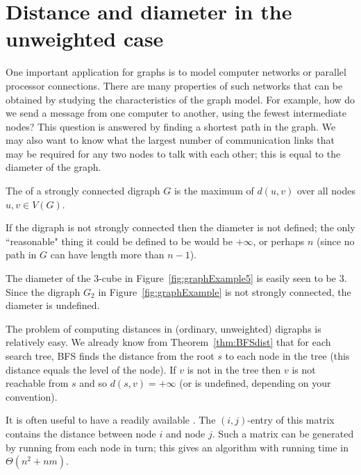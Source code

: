 \section{Distance and diameter in the unweighted
case}\label{sec:unweighted}

One important application for graphs is to model computer networks or
parallel processor connections.  There are many properties of such
networks that can be obtained by studying the characteristics of the
graph model. For example, how do we send a message from one computer to
another, using the fewest intermediate nodes? This question is answered
by finding a shortest path in the graph.  We may also want to know what
the largest number of communication links that may be required for any
two nodes to talk with each other; this is equal to the diameter of
the graph.

\begin{Definition}\label{def:diameter}
The  of a strongly connected digraph $G$ is the
maximum of $d(u,v)$ over all nodes $u, v\in V(G)$.
\end{Definition}

\begin{note} If the digraph is not strongly connected then the
diameter is not defined; the only ``reasonable" thing it could be
defined to be would be $+\infty$, or perhaps $n$ (since 
no path in $G$ can have length more than $n-1$).
\end{note}

\begin{Example}
The diameter of the $3$-cube in Figure~\ref{fig:graphExample5} is easily
seen to be $3$. Since the digraph $G_2$ in Figure~\ref{fig:graphExample}
is not strongly connected, the diameter is undefined.  
\end{Example}

The problem of computing distances in (ordinary, unweighted) digraphs is
relatively easy. We already know from Theorem~\ref{thm:BFSdist} that
for each search tree, BFS finds the distance from the root $s$ to each
node in the tree (this distance equals the level of the node). If $v$
is not in the tree then $v$ is not reachable from $s$ and so $d(s,v) =
+\infty$ (or is undefined,  depending on your convention). 

It is often useful to have a readily available .
The $(i, j)$-entry of this matrix contains the distance between node $i$
and node $j$. Such a matrix can be generated by running 
from each node in turn; this gives an algorithm with running time in
$\Theta(n^2+nm)$.


